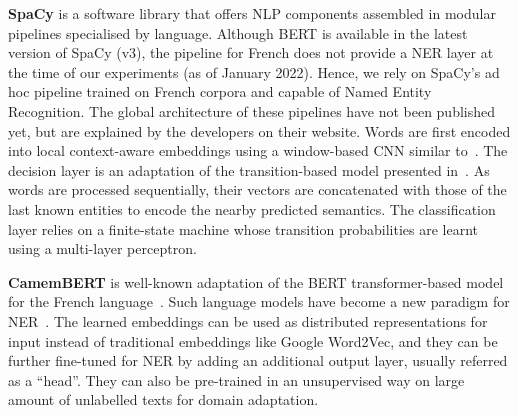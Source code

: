 \textbf{SpaCy} is a software library that offers NLP components assembled in modular pipelines specialised by language.
Although BERT is available in the latest version of SpaCy (v3), the pipeline for French does not provide a NER layer at the time of our experiments (as of January 2022).
Hence, we rely on SpaCy's ad hoc pipeline trained on French corpora and capable of Named Entity Recognition.
The global architecture of these pipelines have not been published yet, but are explained by the developers on their website.
Words are first encoded into local context-aware embeddings using a window-based CNN similar to~\cite{collobert2011}.
The decision layer is an adaptation of the transition-based model presented in~\cite{lample2016}.
As words are processed sequentially, their vectors are concatenated with those of the last known entities to encode the nearby predicted semantics.
The classification layer relies on a finite-state machine whose transition probabilities are learnt using a multi-layer perceptron.



\textbf{CamemBERT} is well-known adaptation of the BERT transformer-based model for the French language~\cite{vaswani2017attention,devlin2018bert,martin-etal-2020-camembert}. Such language models have become a new paradigm for NER~\cite{li2020}. 
The learned embeddings can be used as distributed representations for input instead of traditional embeddings like Google Word2Vec, and they can be further fine-tuned for NER by adding an additional output layer, usually referred as a ``head''. 
They can also be pre-trained in an unsupervised way on large amount of unlabelled texts for domain adaptation.

